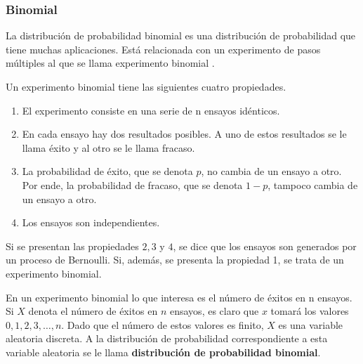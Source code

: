 \documentclass[
  11pt,
]{book}
\providecommand{\tightlist}{%
  \setlength{\itemsep}{0pt}\setlength{\parskip}{0pt}}
\theoremstyle{definition}
\theoremstyle{definition}
\theoremstyle{definition}
\theoremstyle{definition}
\theoremstyle{remark}
\begin{document}
\subsubsection{Binomial}\label{binomial}

La distribución de probabilidad binomial es una distribución de probabilidad que tiene muchas aplicaciones. Está relacionada con un experimento de pasos múltiples al que se llama experimento binomial \citep[paǵina 200]{anderson}.

Un experimento binomial tiene las siguientes cuatro propiedades.

\begin{enumerate}
\def\labelenumi{\arabic{enumi}.}
\tightlist
\item
  El experimento consiste en una serie de n ensayos idénticos.
\item
  En cada ensayo hay dos resultados posibles. A uno de estos resultados se le llama éxito y al otro se le llama fracaso.
\item
  La probabilidad de éxito, que se denota \(p\), no cambia de un ensayo a otro. Por ende, la probabilidad de fracaso, que se denota \(1 - p\), tampoco cambia de un ensayo a otro.
\item
  Los ensayos son independientes.
\end{enumerate}

Si se presentan las propiedades \(2, 3\) y \(4\), se dice que los ensayos son generados por un proceso de Bernoulli. Si, además, se presenta la propiedad 1, se trata de un experimento binomial.

En un experimento binomial lo que interesa es el número de éxitos en n ensayos. Si \(X\) denota el número de éxitos en \(n\) ensayos, es claro que \(x\) tomará los valores \(0, 1, 2, 3, \ldots, n\). Dado que el número de estos valores es finito, \(X\) es una variable aleatoria discreta. A la distribución de probabilidad correspondiente a esta variable aleatoria se le llama \textbf{distribución de probabilidad binomial}.
\end{document}
